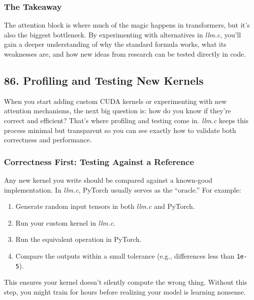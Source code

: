 \documentclass[
  letterpaper,
  DIV=11,
  numbers=noendperiod]{scrreprt}
\providecommand{\tightlist}{%
  \setlength{\itemsep}{0pt}\setlength{\parskip}{0pt}}
\begin{document}
\subsubsection{The Takeaway}\label{the-takeaway-74}

The attention block is where much of the magic happens in transformers,
but it's also the biggest bottleneck. By experimenting with alternatives
in \emph{llm.c}, you'll gain a deeper understanding of why the standard
formula works, what its weaknesses are, and how new ideas from research
can be tested directly in code.

\subsection{86. Profiling and Testing New
Kernels}\label{profiling-and-testing-new-kernels}

When you start adding custom CUDA kernels or experimenting with new
attention mechanisms, the next big question is: how do you know if
they're correct and efficient? That's where profiling and testing come
in. \emph{llm.c} keeps this process minimal but transparent so you can
see exactly how to validate both correctness and performance.

\subsubsection{Correctness First: Testing Against a
Reference}\label{correctness-first-testing-against-a-reference}

Any new kernel you write should be compared against a known-good
implementation. In \emph{llm.c}, PyTorch usually serves as the
``oracle.'' For example:

\begin{enumerate}
\def\labelenumi{\arabic{enumi}.}
\tightlist
\item
  Generate random input tensors in both \emph{llm.c} and PyTorch.
\item
  Run your custom kernel in \emph{llm.c}.
\item
  Run the equivalent operation in PyTorch.
\item
  Compare the outputs within a small tolerance (e.g., differences less
  than \texttt{1e-5}).
\end{enumerate}

This ensures your kernel doesn't silently compute the wrong thing.
Without this step, you might train for hours before realizing your model
is learning nonsense.
\end{document}
